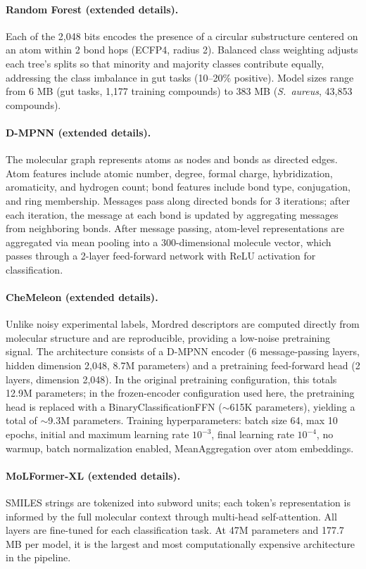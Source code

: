 \documentclass{article}
\begin{document}
\paragraph{Random Forest (extended details).}
Each of the 2,048 bits encodes the presence of a circular substructure centered on an atom within 2 bond hops (ECFP4, radius 2).
Balanced class weighting adjusts each tree's splits so that minority and majority classes contribute equally, addressing the class imbalance in gut tasks (10--20\% positive).
Model sizes range from 6 MB (gut tasks, 1,177 training compounds) to 383 MB (\textit{S.~aureus}, 43,853 compounds).

\paragraph{D-MPNN (extended details).}
The molecular graph represents atoms as nodes and bonds as directed edges.
Atom features include atomic number, degree, formal charge, hybridization, aromaticity, and hydrogen count; bond features include bond type, conjugation, and ring membership.
Messages pass along directed bonds for 3 iterations; after each iteration, the message at each bond is updated by aggregating messages from neighboring bonds.
After message passing, atom-level representations are aggregated via mean pooling into a 300-dimensional molecule vector, which passes through a 2-layer feed-forward network with ReLU activation for classification.

\paragraph{CheMeleon (extended details).}
Unlike noisy experimental labels, Mordred descriptors are computed directly from molecular structure and are reproducible, providing a low-noise pretraining signal.
The architecture consists of a D-MPNN encoder (6 message-passing layers, hidden dimension 2,048, 8.7M parameters) and a pretraining feed-forward head (2 layers, dimension 2,048).
In the original pretraining configuration, this totals 12.9M parameters; in the frozen-encoder configuration used here, the pretraining head is replaced with a BinaryClassificationFFN (${\sim}$615K parameters), yielding a total of ${\sim}$9.3M parameters.
Training hyperparameters: batch size 64, max 10 epochs, initial and maximum learning rate $10^{-3}$, final learning rate $10^{-4}$, no warmup, batch normalization enabled, MeanAggregation over atom embeddings.

\paragraph{MoLFormer-XL (extended details).}
SMILES strings are tokenized into subword units; each token's representation is informed by the full molecular context through multi-head self-attention.
All layers are fine-tuned for each classification task.
At 47M parameters and 177.7 MB per model, it is the largest and most computationally expensive architecture in the pipeline.
\end{document}
